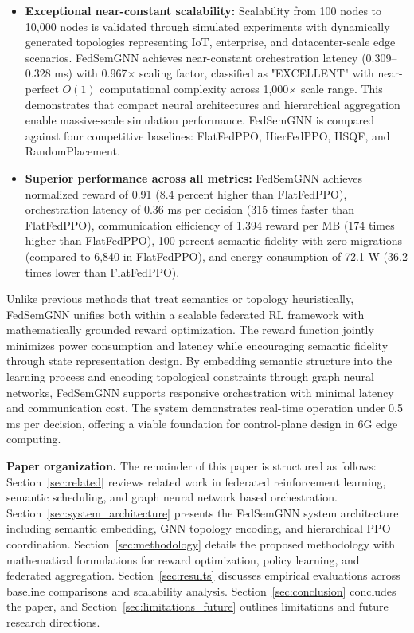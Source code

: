 \documentclass[conference]{IEEEtran}
\begin{document}
\begin{itemize}
		\item \textbf{Exceptional near-constant scalability:} Scalability from 100 nodes to 10,000 nodes is validated through simulated experiments with dynamically generated topologies representing IoT, enterprise, and datacenter-scale edge scenarios. FedSemGNN achieves near-constant orchestration latency (0.309--0.328 ms) with 0.967$\times$ scaling factor, classified as "EXCELLENT" with near-perfect $O(1)$ computational complexity across 1,000$\times$ scale range. This demonstrates that compact neural architectures and hierarchical aggregation enable massive-scale simulation performance. FedSemGNN is compared against four competitive baselines: FlatFedPPO, HierFedPPO, HSQF, and RandomPlacement.
		
		\item \textbf{Superior performance across all metrics:} FedSemGNN achieves normalized reward of 0.91 (8.4 percent higher than FlatFedPPO), orchestration latency of 0.36 ms per decision (315 times faster than FlatFedPPO), communication efficiency of 1.394 reward per MB (174 times higher than FlatFedPPO), 100 percent semantic fidelity with zero migrations (compared to 6,840 in FlatFedPPO), and energy consumption of 72.1 W (36.2 times lower than FlatFedPPO).
	\end{itemize}
	
	Unlike previous methods that treat semantics or topology heuristically, FedSemGNN unifies both within a scalable federated RL framework with mathematically grounded reward optimization. The reward function jointly minimizes power consumption and latency while encouraging semantic fidelity through state representation design. By embedding semantic structure into the learning process and encoding topological constraints through graph neural networks, FedSemGNN supports responsive orchestration with minimal latency and communication cost. The system demonstrates real-time operation under 0.5 ms per decision, offering a viable foundation for control-plane design in 6G edge computing.
	
	\noindent\textbf{Paper organization.} The remainder of this paper is structured as follows: Section~\ref{sec:related} reviews related work in federated reinforcement learning, semantic scheduling, and graph neural network based orchestration. Section~\ref{sec:system_architecture} presents the FedSemGNN system architecture including semantic embedding, GNN topology encoding, and hierarchical PPO coordination. Section~\ref{sec:methodology} details the proposed methodology with mathematical formulations for reward optimization, policy learning, and federated aggregation. Section~\ref{sec:results} discusses empirical evaluations across baseline comparisons and scalability analysis. Section~\ref{sec:conclusion} concludes the paper, and Section~\ref{sec:limitations_future} outlines limitations and future research directions.
	
\end{document}
